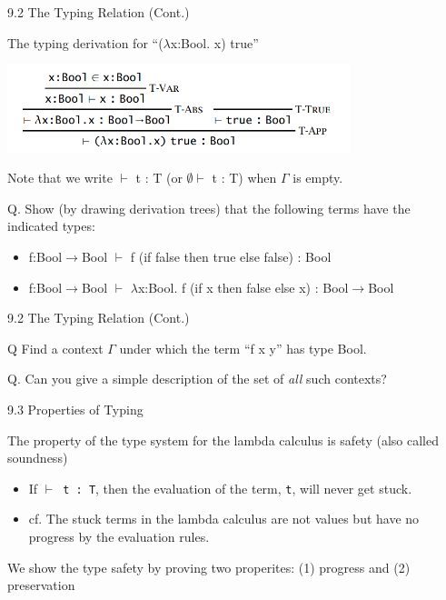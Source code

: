 \documentclass[table]{beamer}
\begin{document}
\begin{frame}[t]{9.2 The Typing Relation (Cont.)} \vspace{10pt}

The typing derivation for ``($\lambda$x:Bool. x) true''

\includegraphics[width=10cm]{typingderivation_ch9}

\vspace{10pt}

Note that we write $\vdash$ t : T  (or $\emptyset \vdash$ t : T)  when $\Gamma$ is empty.

\vspace{10pt}

Q. Show (by drawing derivation trees) that the following terms have the indicated types:

\begin{itemize}
\item f:Bool$\rightarrow$Bool $\vdash$ f (if false then true else false) : Bool
\item f:Bool$\rightarrow$Bool $\vdash$ $\lambda$x:Bool. f (if x then false else x) : Bool$\rightarrow$Bool
\end{itemize}

\end{frame}

\begin{frame}[t]{9.2 The Typing Relation (Cont.)} \vspace{10pt}

Q Find a context $\Gamma$ under which the term ``f x y'' has type Bool. 

\vspace{10pt}

Q. Can you give a simple description of the set of {\it all} such contexts?

\end{frame}

\begin{frame}[t]{9.3 Properties of Typing} \vspace{10pt}

The property of the type system for the lambda calculus is safety (also called soundness)

\begin{itemize}
\item If \texttt{$\vdash$ t : T}, then the evaluation of the term, \texttt{t}, will never get stuck. 
\item cf. The stuck terms in the lambda calculus are not values but have no progress by the evaluation rules.
\end{itemize}

\vspace*{10pt}

We show the type safety by proving two properites: (1) progress and (2) preservation


\end{frame}
\end{document}
